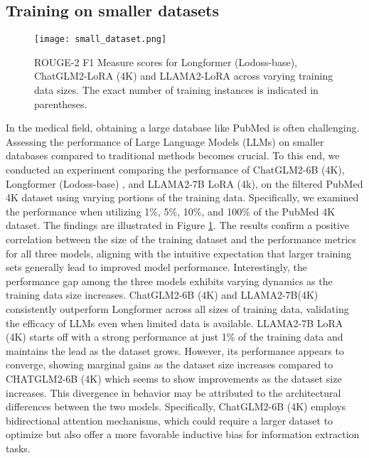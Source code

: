 \subsection{Training on smaller datasets}
\label{sec:small_datasets}
\begin{figure}
    \centering
    \texttt{[image: small\_dataset.png]}
    \caption{ROUGE-2 F1 Measure scores for Longformer (Lodoss-base), ChatGLM2-LoRA (4K) and LLAMA2-LoRA across varying training data sizes. The exact number of training instances is indicated in parentheses.}
    \label{fig:datasetsize}
\end{figure}

In the medical field, obtaining a large database like PubMed is often challenging. Assessing the performance of Large Language Models (LLMs) on smaller databases compared to traditional methods becomes crucial. To this end, we conducted an experiment comparing the performance of ChatGLM2-6B (4K), Longformer (Lodoss-base) \cite{cho-etal-2022-toward}, and LLAMA2-7B LoRA (4k), on the filtered PubMed 4K dataset using varying portions of the training data. Specifically, we examined the performance when utilizing 1\%, 5\%, 10\%, and 100\% of the PubMed 4K dataset. The findings are illustrated in Figure \ref{fig:datasetsize}.
The results confirm a positive correlation between the size of the training dataset and the performance metrics for all three models, aligning with the intuitive expectation that larger training sets generally lead to improved model performance. Interestingly, the performance gap among the three models exhibits varying dynamics as the training data size increases. 
ChatGLM2-6B (4K) and LLAMA2-7B(4K) consistently outperform Longformer across all sizes of training data, validating the efficacy of LLMs even when limited data is available. %
LLAMA2-7B LoRA (4K) starts off with a strong performance at just 1\% of the training data and maintains the lead as the dataset grows. However, its performance appears to converge, showing marginal gains as the dataset size increases compared to CHATGLM2-6B (4K) which seems to show improvements as the dataset size increases. This divergence in behavior may be attributed to the architectural differences between the two models. Specifically, ChatGLM2-6B (4K) employs bidirectional attention mechanisms, which could require a larger dataset to optimize but also offer a more favorable inductive bias for information extraction tasks.

